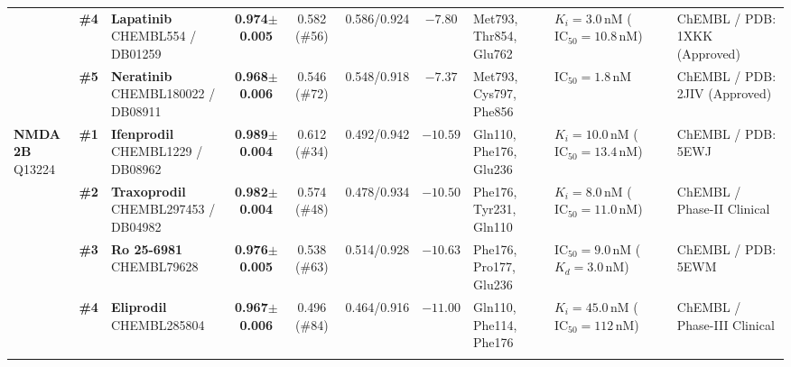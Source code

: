 \begin{table}[H]
{{\begin{tabular}{l c l c c c c l l l}
 & \textbf{\#4} & \parbox[t]{2.20cm}{\raggedright\textbf{Lapatinib}\newline CHEMBL554 / DB01259} & \textbf{0.974${\pm}$0.005} & 0.582 (\#56) & 0.586/0.924 & $-7.80$ & \parbox[t]{1.72cm}{\raggedright Met793, Thr854, Glu762} & \parbox[t]{1.92cm}{\raggedright $K_i = 3.0\,\mathrm{nM}$ ($\mathrm{IC}_{50} = 10.8\,\mathrm{nM}$)} & \parbox[t]{1.75cm}{\raggedright ChEMBL / PDB: 1XKK (Approved)} \\\addlinespace[2.2pt]
 & \textbf{\#5} & \parbox[t]{2.20cm}{\raggedright\textbf{Neratinib}\newline CHEMBL180022 / DB08911} & \textbf{0.968${\pm}$0.006} & 0.546 (\#72) & 0.548/0.918 & $-7.37$ & \parbox[t]{1.72cm}{\raggedright Met793, Cys797, Phe856} & \parbox[t]{1.92cm}{\raggedright $\mathrm{IC}_{50} = 1.8\,\mathrm{nM}$} & \parbox[t]{1.75cm}{\raggedright ChEMBL / PDB: 2JIV (Approved)} \\\addlinespace[2.2pt]
\midrule
\parbox[t]{1.22cm}{\raggedright\textbf{NMDA 2B}\newline Q13224} & \textbf{\#1} & \parbox[t]{2.20cm}{\raggedright\textbf{Ifenprodil}\newline CHEMBL1229 / DB08962} & \textbf{0.989${\pm}$0.004} & 0.612 (\#34) & 0.492/0.942 & $-10.59$ & \parbox[t]{1.72cm}{\raggedright Gln110, Phe176, Glu236} & \parbox[t]{1.92cm}{\raggedright $K_i = 10.0\,\mathrm{nM}$ ($\mathrm{IC}_{50} = 13.4\,\mathrm{nM}$)} & \parbox[t]{1.75cm}{\raggedright ChEMBL / PDB: 5EWJ} \\\addlinespace[2.2pt]
 & \textbf{\#2} & \parbox[t]{2.20cm}{\raggedright\textbf{Traxoprodil}\newline CHEMBL297453 / DB04982} & \textbf{0.982${\pm}$0.004} & 0.574 (\#48) & 0.478/0.934 & $-10.50$ & \parbox[t]{1.72cm}{\raggedright Phe176, Tyr231, Gln110} & \parbox[t]{1.92cm}{\raggedright $K_i = 8.0\,\mathrm{nM}$ ($\mathrm{IC}_{50} = 11.0\,\mathrm{nM}$)} & \parbox[t]{1.75cm}{\raggedright ChEMBL / Phase-II Clinical} \\\addlinespace[2.2pt]
 & \textbf{\#3} & \parbox[t]{2.20cm}{\raggedright\textbf{Ro 25-6981}\newline CHEMBL79628} & \textbf{0.976${\pm}$0.005} & 0.538 (\#63) & 0.514/0.928 & $-10.63$ & \parbox[t]{1.72cm}{\raggedright Phe176, Pro177, Glu236} & \parbox[t]{1.92cm}{\raggedright $\mathrm{IC}_{50} = 9.0\,\mathrm{nM}$ ($K_d = 3.0\,\mathrm{nM}$)} & \parbox[t]{1.75cm}{\raggedright ChEMBL / PDB: 5EWM} \\\addlinespace[2.2pt]
 & \textbf{\#4} & \parbox[t]{2.20cm}{\raggedright\textbf{Eliprodil}\newline CHEMBL285804} & \textbf{0.967${\pm}$0.006} & 0.496 (\#84) & 0.464/0.916 & $-11.00$ & \parbox[t]{1.72cm}{\raggedright Gln110, Phe114, Phe176} & \parbox[t]{1.92cm}{\raggedright $K_i = 45.0\,\mathrm{nM}$ ($\mathrm{IC}_{50} = 112\,\mathrm{nM}$)} & \parbox[t]{1.75cm}{\raggedright ChEMBL / Phase-III Clinical} \\\addlinespace[2.2pt]

\end{tabular}}}
\end{table}
